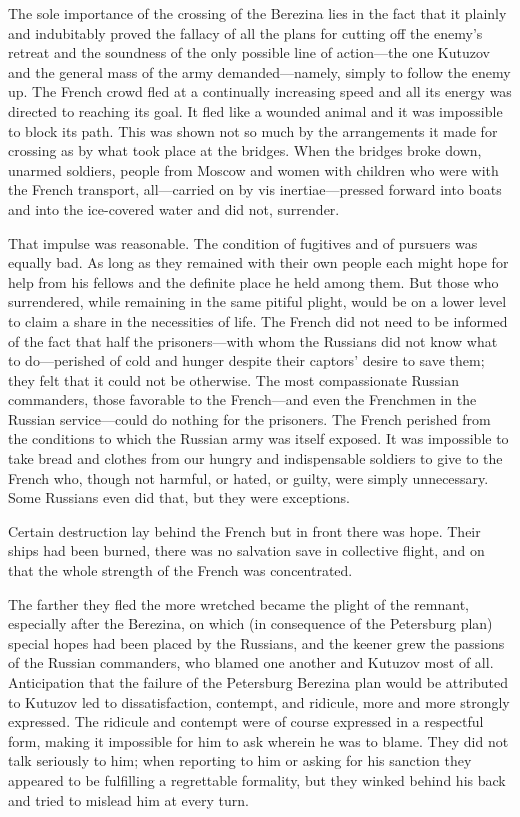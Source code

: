 The sole importance of the crossing of the Berezina lies in the
fact that it plainly and indubitably proved the fallacy of all
the plans for cutting off the enemy's retreat and the soundness
of the only possible line of action---the one Kutuzov and the
general mass of the army demanded---namely, simply to follow the
enemy up. The French crowd fled at a continually increasing speed
and all its energy was directed to reaching its goal. It fled
like a wounded animal and it was impossible to block its
path. This was shown not so much by the arrangements it made for
crossing as by what took place at the bridges. When the bridges
broke down, unarmed soldiers, people from Moscow and women with
children who were with the French transport, all---carried on by
vis inertiae---pressed forward into boats and into the
ice-covered water and did not, surrender.

That impulse was reasonable. The condition of fugitives and of
pursuers was equally bad. As long as they remained with their own
people each might hope for help from his fellows and the definite
place he held among them. But those who surrendered, while
remaining in the same pitiful plight, would be on a lower level
to claim a share in the necessities of life. The French did not
need to be informed of the fact that half the prisoners---with
whom the Russians did not know what to do---perished of cold and
hunger despite their captors' desire to save them; they felt that
it could not be otherwise. The most compassionate Russian
commanders, those favorable to the French---and even the
Frenchmen in the Russian service---could do nothing for the
prisoners. The French perished from the conditions to which the
Russian army was itself exposed. It was impossible to take bread
and clothes from our hungry and indispensable soldiers to give to
the French who, though not harmful, or hated, or guilty, were
simply unnecessary. Some Russians even did that, but they were
exceptions.

Certain destruction lay behind the French but in front there was
hope.  Their ships had been burned, there was no salvation save
in collective flight, and on that the whole strength of the
French was concentrated.

The farther they fled the more wretched became the plight of the
remnant, especially after the Berezina, on which (in consequence
of the Petersburg plan) special hopes had been placed by the
Russians, and the keener grew the passions of the Russian
commanders, who blamed one another and Kutuzov most of
all. Anticipation that the failure of the Petersburg Berezina
plan would be attributed to Kutuzov led to dissatisfaction,
contempt, and ridicule, more and more strongly expressed. The
ridicule and contempt were of course expressed in a respectful
form, making it impossible for him to ask wherein he was to
blame. They did not talk seriously to him; when reporting to him
or asking for his sanction they appeared to be fulfilling a
regrettable formality, but they winked behind his back and tried
to mislead him at every turn.

